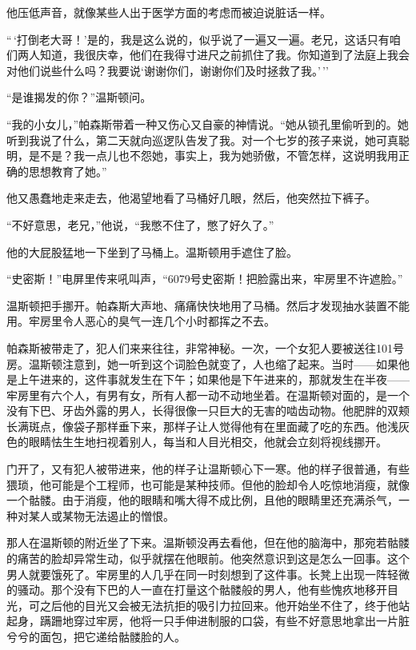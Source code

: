 他压低声音，就像某些人出于医学方面的考虑而被迫说脏话一样。

``\,`打倒老大哥！'是的，我是这么说的，似乎说了一遍又一遍。老兄，这话只有咱们两人知道，我很庆幸，他们在我得寸进尺之前抓住了我。你知道到了法庭上我会对他们说些什么吗？我要说`谢谢你们，谢谢你们及时拯救了我。'\,''

``是谁揭发的你？''温斯顿问。

``我的小女儿，''帕森斯带着一种又伤心又自豪的神情说。``她从锁孔里偷听到的。她听到我说了什么，第二天就向巡逻队告发了我。对一个七岁的孩子来说，她可真聪明，是不是？我一点儿也不怨她，事实上，我为她骄傲，不管怎样，这说明我用正确的思想教育了她。''

他又愚蠢地走来走去，他渴望地看了马桶好几眼，然后，他突然拉下裤子。

``不好意思，老兄，''他说，``我憋不住了，憋了好久了。''

他的大屁股猛地一下坐到了马桶上。温斯顿用手遮住了脸。

``史密斯！''电屏里传来吼叫声，``6079号史密斯！把脸露出来，牢房里不许遮脸。''

温斯顿把手挪开。帕森斯大声地、痛痛快快地用了马桶。然后才发现抽水装置不能用。牢房里令人恶心的臭气一连几个小时都挥之不去。

帕森斯被带走了，犯人们来来往往，非常神秘。一次，一个女犯人要被送往101号房。温斯顿注意到，她一听到这个词脸色就变了，人也缩了起来。当时——如果他是上午进来的，这件事就发生在下午；如果他是下午进来的，那就发生在半夜——牢房里有六个人，有男有女，所有人都一动不动地坐着。在温斯顿对面的，是一个没有下巴、牙齿外露的男人，长得很像一只巨大的无害的啮齿动物。他肥胖的双颊长满斑点，像袋子那样垂下来，那样子让人觉得他有在里面藏了吃的东西。他浅灰色的眼睛怯生生地扫视着别人，每当和人目光相交，他就会立刻将视线挪开。

门开了，又有犯人被带进来，他的样子让温斯顿心下一寒。他的样子很普通，有些猥琐，他可能是个工程师，也可能是某种技师。但他的脸却令人吃惊地消瘦，就像一个骷髅。由于消瘦，他的眼睛和嘴大得不成比例，且他的眼睛里还充满杀气，一种对某人或某物无法遏止的憎恨。

那人在温斯顿的附近坐了下来。温斯顿没再去看他，但在他的脑海中，那宛若骷髅的痛苦的脸却异常生动，似乎就摆在他眼前。他突然意识到这是怎么一回事。这个男人就要饿死了。牢房里的人几乎在同一时刻想到了这件事。长凳上出现一阵轻微的骚动。那个没有下巴的人一直在打量这个骷髅般的男人，他有些愧疚地移开目光，可之后他的目光又会被无法抗拒的吸引力拉回来。他开始坐不住了，终于他站起身，蹒跚地穿过牢房，他将一只手伸进制服的口袋，有些不好意思地拿出一片脏兮兮的面包，把它递给骷髅脸的人。

